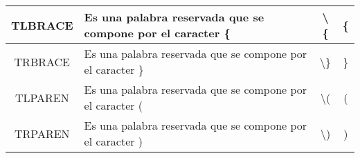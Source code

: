 \documentclass[12pt,a4paper,landscape]{article}
\theoremstyle{mytheor}
\begin{document}
\begin{longtable}[c]{|c|c|c|c|}
TLBRACE      & \multicolumn{1}{l|}{Es una palabra reservada que se compone por el caracter \{}                                                                                                                                                                                                                                                                                                                             & \textbackslash{}\{                                                                  &\{                                                                                                                                                                                                                                               \\ \hline
TRBRACE      & \multicolumn{1}{l|}{Es una palabra reservada que se compone por el caracter \}}                                                                                                                                                                                                                                                                                                                             & \textbackslash{}\}                                                                  &\}                                                                                                                                                                                                                                               \\ \hline
TLPAREN      & \multicolumn{1}{l|}{Es una palabra reservada que se compone por el caracter (}                                                                                                                                                                                                                                                                                                                              & \textbackslash{}(                                                   & (                                                                                                                                                                                                                                                \\ \hline
TRPAREN      & \multicolumn{1}{l|}{Es una palabra reservada que se compone por el caracter )}                                                                                                                                                                                                                                                                                                                              & \textbackslash{})                                                   & )                                                                                                                                                                                                                                                \\ \hline

\end{longtable}
\end{document}
